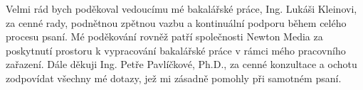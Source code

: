 \documentclass[czech,bachelor,oneside]{ctufit-thesis}
\begin{document}
 
\frontmatter\frontmatterinit %

\thispagestyle{empty}\maketitle\thispagestyle{empty}\cleardoublepage %


\imprintpage %
\stopTOCentries

\begin{acknowledgmentpage}
    Velmi rád bych poděkoval vedoucímu mé bakalářské práce, Ing. Lukáši Kleinovi, za cenné rady, podnětnou zpětnou vazbu a kontinuální podporu během celého procesu psaní. Mé poděkování rovněž patří společnosti Newton Media za poskytnutí prostoru k vypracování bakalářské práce v rámci mého pracovního zařazení. Dále děkuji Ing. Petře Pavlíčkové, Ph.D., za cenné konzultace a ochotu zodpovídat všechny mé dotazy, jež mi zásadně pomohly při samotném psaní.
\end{acknowledgmentpage} 
\end{document}

